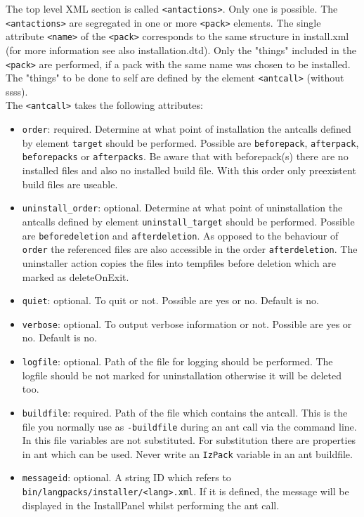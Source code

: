 The top level XML section is called \texttt{<antactions>}. Only
one is possible. The \texttt{<antactions>} are segregated in one or more
\texttt{<pack>} elements. The single attribute \texttt{<name>} of
the \texttt{<pack>} corresponds to the same structure in
install.xml (for more information see also installation.dtd). Only the 
"things" included in the \texttt{<pack>} are performed, if a
pack with the same name was chosen to be installed. The "things"
to be done to self are defined by the element \texttt{<antcall>} (without
ssss).\\
The \texttt{<antcall>} takes the following attributes:
\begin{itemize}
    \item \texttt{order}: required. Determine at what point of installation the antcalls
    defined by element \texttt{target} should be
    performed. Possible are
    \texttt{beforepack}, \texttt{afterpack}, \texttt{beforepacks} or \texttt{afterpacks}. Be aware that 
    with beforepack(s) there are no installed files and also no installed
    build file. With this order only preexistent build files are
    useable.

    \item \texttt{uninstall\_order}: optional. Determine at what point of uninstallation
                 the antcalls defined by element \texttt{uninstall\_target}
                 should be performed. Possible are \texttt{beforedeletion}
                 and \texttt{afterdeletion}. As opposed to the
                 behaviour of \texttt{order} the referenced files
                 are also accessible in the order
                 \texttt{afterdeletion}. The
                 uninstaller action copies the files into
                 tempfiles  before deletion which are marked as deleteOnExit.
    \item \texttt{quiet}: optional. To quit or not. Possible are yes or
    no. Default is no.
    \item \texttt{verbose}: optional. To output verbose information or not. Possible are yes
    or no. Default is no.
    \item \texttt{logfile}: optional. Path of the file for logging should
    be performed. The logfile should be not marked for
    uninstallation otherwise it will be deleted too.
    \item \texttt{buildfile}: required. Path of the file which contains the
    antcall. This is the file you normally use as \texttt{-buildfile} during an ant call via the command
    line. In this file variables are not substituted. For
    substitution there are properties in ant which can be used.
    Never write an \texttt{IzPack} variable in an ant buildfile.
    \item \texttt{messageid}: optional. A string ID which refers to \\
    \texttt{bin/langpacks/installer/<lang>.xml}. If it is defined, the message
    will be displayed in the InstallPanel whilst performing the ant call.
\end{itemize}
